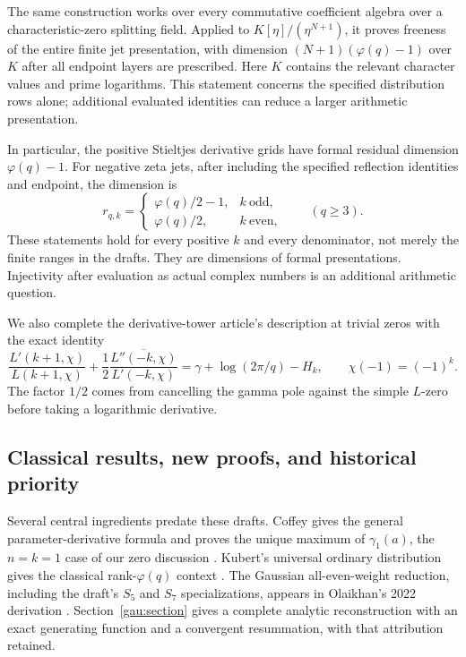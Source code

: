 The same construction works over every commutative coefficient algebra
over a characteristic-zero splitting field. Applied to
$K[\eta]/(\eta^{N+1})$, it proves freeness of the entire finite jet
presentation, with dimension $(N+1)(\varphi(q)-1)$ over $K$ after all
endpoint layers are prescribed. Here $K$ contains the relevant character
values and prime logarithms. This statement concerns the specified
distribution rows alone; additional evaluated identities can reduce a
larger arithmetic presentation.

In particular, the positive Stieltjes derivative grids have formal
residual dimension $\varphi(q)-1$.  For negative zeta jets, after
including the specified reflection identities and endpoint, the
dimension is
\[
 r_{q,k}=\begin{cases}
 \varphi(q)/2-1,& k\ \text{odd},\\
 \varphi(q)/2,& k\ \text{even},
 \end{cases}\qquad(q\geq3).
\]
These statements hold for every positive $k$ and every denominator,
not merely the finite ranges in the drafts.  They are dimensions of
formal presentations.  Injectivity after evaluation as actual complex
numbers is an additional arithmetic question.

We also complete the derivative-tower article's description at trivial
zeros with the exact identity
\[
 \frac{L'(k+1,\chi)}{L(k+1,\chi)}
 +\frac12\overline{\frac{L''(-k,\chi)}{L'(-k,\chi)}}
 =\gamma+\log(2\pi/q)-H_k,
 \qquad\chi(-1)=(-1)^k.
\]
The factor $1/2$ comes from cancelling the gamma pole against the
simple $L$-zero before taking a logarithmic derivative.

\subsection{Classical results, new proofs, and historical priority}

Several central ingredients predate these drafts.  Coffey gives the
general parameter-derivative formula and proves the unique maximum of
$\gamma_1(a)$, the $n=k=1$ case of our zero discussion
\cite{Coffey2009}.  Kubert's universal ordinary distribution gives the
classical rank-$\varphi(q)$ context \cite{Kubert1979}.  The Gaussian
all-even-weight reduction, including the draft's $S_5$ and $S_7$
specializations, appears in Olaikhan's 2022 derivation
\cite{gau-olaikhan-2022}.  Section~\ref{gau:section} gives a complete
analytic reconstruction with an exact generating function and a
convergent resummation, with that attribution retained.

